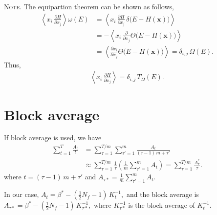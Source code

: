 \documentclass[reprint]{revtex4-1}
\newcommand{\note}[1]{{\color{DarkGreen}\footnotesize \textsc{Note.} #1}}
\begin{document}
\note{
  The equipartion theorem can be shown as follows,
  \begin{align*}
    \left\langle
      x_i \,
      \frac{ \partial H } { \partial x_j }
    \right\rangle
    \omega(E)
    &=
    \left\langle
      x_i \,
      \frac{ \partial H } { \partial x_j }
      \,
      \delta\bigl(
        E - H(\mathbf x)
      \bigr)
    \right\rangle \\
    &=
    -
    \left\langle
      x_i \,
      \frac{ \partial } { \partial x_j }
      \Theta\bigl(
        E - H(\mathbf x)
      \bigr)
    \right\rangle
    \\
    &=
    \left\langle
      \frac{ \partial x_i } { \partial x_j }
      \Theta\bigl(
        E - H(\mathbf x)
      \bigr)
    \right\rangle
    =
    \delta_{i, j} \, \Omega(E)
    .
  \end{align*}
  Thus,
  \begin{align*}
    \left\langle
      x_i \,
      \frac{ \partial H } { \partial x_j }
    \right\rangle
    =
    \delta_{i, j} \, T_\Omega(E)
    .
  \end{align*}
}



\section{\label{sec:block}
Block average}



If block average is used, we have
%
\begin{align*}
  \sum_{t = 1}^T \frac{ A_t } { t }
  &=
  \sum_{\tau = 1}^{T/m}
  \sum_{\tau' = 1}^{m}
  \frac{ A_t } { (\tau - 1) \, m + \tau' }
  \\
  &\approx
  \sum_{\tau = 1}^{T/m}
  \frac{ 1 } { \tau }
  \left(
    \frac 1 m
    \sum_{\tau' = 1}^m
    A_t
  \right)
  =
  \sum_{\tau = 1}^{T/m}
  \frac{ A^*_\tau } { \tau }
  .
\end{align*}
%
where
$t = (\tau - 1) \, m + \tau'$
and
$
A_{\tau*} = \frac 1 m
\sum_{\tau' = 1}^m A_t.
$

In our case,
$
A_t = \beta^* - \left(\frac {1} {2} N_f - 1\right) \, K_t^{-1},
$
and the block average is
$
A_{\tau*}
= \beta^* - \left(\frac {1} {2} N_f - 1\right) \, K_{\tau*}^{-1},
$
where $K_{\tau*}^{-1}$
is the block average of $K_t^{-1}$.

%

\end{document}
